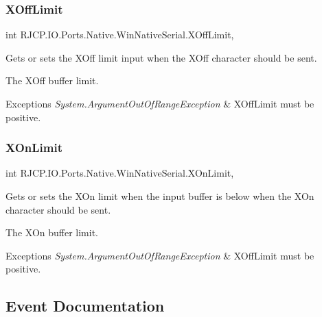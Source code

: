 \subsubsection{\texorpdfstring{XOffLimit}{XOffLimit}}
{\footnotesize\ttfamily int R\+J\+C\+P.\+I\+O.\+Ports.\+Native.\+Win\+Native\+Serial.\+X\+Off\+Limit\hspace{0.3cm}{\ttfamily [get]}, {\ttfamily [set]}}



Gets or sets the X\+Off limit input when the X\+Off character should be sent. 

The X\+Off buffer limit. 


\begin{DoxyExceptions}{Exceptions}
{\em System.\+Argument\+Out\+Of\+Range\+Exception} & X\+Off\+Limit must be positive.\\
\hline
\end{DoxyExceptions}
\mbox{\label{class_r_j_c_p_1_1_i_o_1_1_ports_1_1_native_1_1_win_native_serial_a33c81ce663d8a1a78c74be34fe80492b}} 
\subsubsection{\texorpdfstring{XOnLimit}{XOnLimit}}
{\footnotesize\ttfamily int R\+J\+C\+P.\+I\+O.\+Ports.\+Native.\+Win\+Native\+Serial.\+X\+On\+Limit\hspace{0.3cm}{\ttfamily [get]}, {\ttfamily [set]}}



Gets or sets the X\+On limit when the input buffer is below when the X\+On character should be sent. 

The X\+On buffer limit. 


\begin{DoxyExceptions}{Exceptions}
{\em System.\+Argument\+Out\+Of\+Range\+Exception} & X\+Off\+Limit must be positive.\\
\hline
\end{DoxyExceptions}


\subsection{Event Documentation}
\mbox{\label{class_r_j_c_p_1_1_i_o_1_1_ports_1_1_native_1_1_win_native_serial_a70c1e2700aceb87a61f626af238f4ce8}} 
